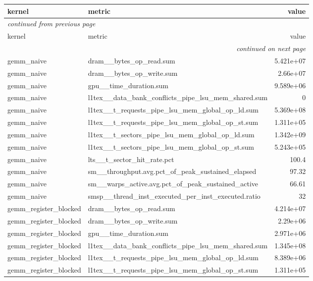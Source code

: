\begin{longtable}{llr}
\toprule
kernel & metric & value \\
\midrule
\endfirsthead
\multicolumn{3}{l}{\small\itshape continued from previous page} \\
\toprule
kernel & metric & value \\
\midrule
\endhead
\midrule
\multicolumn{3}{r}{\small\itshape continued on next page} \\
\endfoot
\bottomrule
\endlastfoot
gemm\_naive & dram\_\_bytes\_op\_read.sum & 5.421e+07 \\
gemm\_naive & dram\_\_bytes\_op\_write.sum & 2.66e+07 \\
gemm\_naive & gpu\_\_time\_duration.sum & 9.589e+06 \\
gemm\_naive & l1tex\_\_data\_bank\_conflicts\_pipe\_lsu\_mem\_shared.sum & 0 \\
gemm\_naive & l1tex\_\_t\_requests\_pipe\_lsu\_mem\_global\_op\_ld.sum & 5.369e+08 \\
gemm\_naive & l1tex\_\_t\_requests\_pipe\_lsu\_mem\_global\_op\_st.sum & 1.311e+05 \\
gemm\_naive & l1tex\_\_t\_sectors\_pipe\_lsu\_mem\_global\_op\_ld.sum & 1.342e+09 \\
gemm\_naive & l1tex\_\_t\_sectors\_pipe\_lsu\_mem\_global\_op\_st.sum & 5.243e+05 \\
gemm\_naive & lts\_\_t\_sector\_hit\_rate.pct & 100.4 \\
gemm\_naive & sm\_\_throughput.avg.pct\_of\_peak\_sustained\_elapsed & 97.32 \\
gemm\_naive & sm\_\_warps\_active.avg.pct\_of\_peak\_sustained\_active & 66.61 \\
gemm\_naive & smsp\_\_thread\_inst\_executed\_per\_inst\_executed.ratio & 32 \\
gemm\_register\_blocked & dram\_\_bytes\_op\_read.sum & 4.214e+07 \\
gemm\_register\_blocked & dram\_\_bytes\_op\_write.sum & 2.29e+06 \\
gemm\_register\_blocked & gpu\_\_time\_duration.sum & 2.971e+06 \\
gemm\_register\_blocked & l1tex\_\_data\_bank\_conflicts\_pipe\_lsu\_mem\_shared.sum & 1.345e+08 \\
gemm\_register\_blocked & l1tex\_\_t\_requests\_pipe\_lsu\_mem\_global\_op\_ld.sum & 8.389e+06 \\
gemm\_register\_blocked & l1tex\_\_t\_requests\_pipe\_lsu\_mem\_global\_op\_st.sum & 1.311e+05 \\

\end{longtable}
